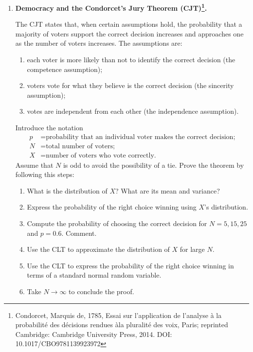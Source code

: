 \documentclass[12pt]{article}
\begin{document}
\begin{enumerate}
\begin{enumerate}
        \item Each bet is independent, meaning that the probability of winning remains 0.49 regardless of past outcomes. A losing streak does not affect future bets, and believing otherwise is a cognitive bias. The correct mindset is to recognize that probabilities reset on each bet.
    \end{enumerate}
    \fi \color{black}

    \item \textbf{Democracy and the Condorcet’s Jury Theorem (CJT)\footnote{Condorcet, Marquis de, 1785, Essai sur l’application de l’analyse à la probabilité des décisions rendues àla pluralité des voix, Paris; reprinted Cambridge: Cambridge University Press, 2014. DOI: 10.1017/CBO9781139923972}.}
    
    The CJT states that, when certain assumptions hold, the probability that a majority of voters support the correct decision increases and approaches one as the number of voters increases. The assumptions are:

    \begin{enumerate}[label=(\roman*)]
        \item each voter is more likely than not to identify the correct decision (the competence assumption);
        \item voters vote for what they believe is the correct decision (the sincerity assumption);
        \item votes are independent from each other (the independence assumption).
    \end{enumerate}

    Introduce the notation
    \begin{align*}
        p &= \text{probability that an individual voter makes the correct decision;}   \\
        N &= \text{total number of voters;} \\
        X &= \text{number of voters who vote correctly.}
    \end{align*}
    Assume that $N$ is odd to avoid the possibility of a tie. 
    Prove the theorem by following this steps:
    \begin{enumerate}[label=(\alph*)]
        \item What is the distribution of $X$? What are its mean and variance?
        \item Express the probability of the right choice winning using $X$'s distribution.
        \item Compute the probability of choosing the correct decision for $N = 5, 15, 25$ and $p = 0.6$. Comment.
        \item Use the CLT to approximate the distribution of $X$ for large $N$. 
        \item Use the CLT to express the probability of the right choice winning in terms of a standard normal random variable.
        \item Take $N\rightarrow\infty$ to conclude the proof.
    \end{enumerate}


\end{enumerate}
\end{document}

